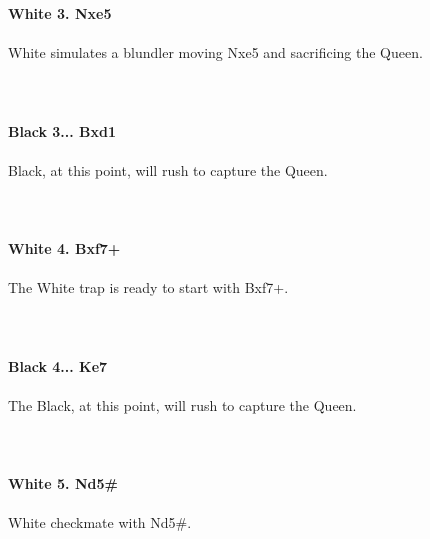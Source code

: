 \documentclass{article}
\begin{document}
\textbf{White 3. Nxe5}\\
\\
White simulates a blundler moving Nxe5 and sacrificing the Queen.\\
\\

\\
\\
\textbf{Black 3... Bxd1}\\
\\
Black, at this point, will rush to capture the Queen.\\
\\

\\
\\
\textbf{White 4. Bxf7+}\\
\\
The White trap is ready to start with Bxf7+.\\
\\

\\
\\
\textbf{Black 4... Ke7}\\
\\
The Black, at this point, will rush to capture the Queen.\\
\\

\\
\\
\textbf{White 5. Nd5\#}\\
\\
White checkmate with Nd5\#.
\end{document}
